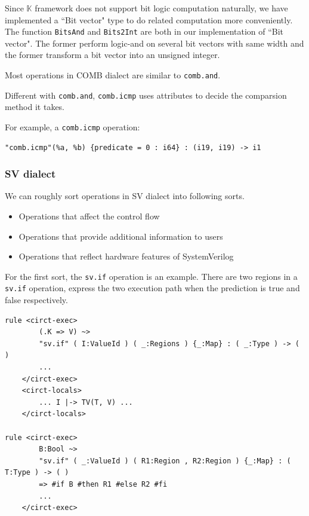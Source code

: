 Since $\mathbb{K}$ framework does not support bit logic computation naturally, we have implemented a ``Bit vector" type to do related computation more conveniently. The function \verb|BitsAnd| and \verb|Bits2Int| are both in our implementation of ``Bit vector". The former perform logic-and on several bit vectors with same width and the former transform a bit vector into an unsigned integer.

Most operations in COMB dialect are similar to \verb|comb.and|.

Different with \verb|comb.and|, \verb|comb.icmp| uses attributes to decide the comparsion method it takes.

For example, a \verb|comb.icmp| operation:
\begin{lstlisting}
"comb.icmp"(%a, %b) {predicate = 0 : i64} : (i19, i19) -> i1
\end{lstlisting}



\subsubsection{SV dialect}

We can roughly sort operations in SV dialect into following sorts.

\begin{itemize}
    \item Operations that affect the control flow
    \item Operations that provide additional information to users
    \item Operations that reflect hardware features of SystemVerilog
\end{itemize}

For the first sort, the \verb|sv.if| operation is an example. There are two regions in a \verb|sv.if| operation, express the two execution path when the prediction is true and false respectively.

\begin{lstlisting}
rule <circt-exec> 
        (.K => V) ~>
        "sv.if" ( I:ValueId ) ( _:Regions ) {_:Map} : ( _:Type ) -> ( )
        ...
    </circt-exec>
    <circt-locals>
        ... I |-> TV(T, V) ...
    </circt-locals>

rule <circt-exec> 
        B:Bool ~>
        "sv.if" ( _:ValueId ) ( R1:Region , R2:Region ) {_:Map} : ( T:Type ) -> ( )
        => #if B #then R1 #else R2 #fi
        ...
    </circt-exec>
\end{lstlisting}

